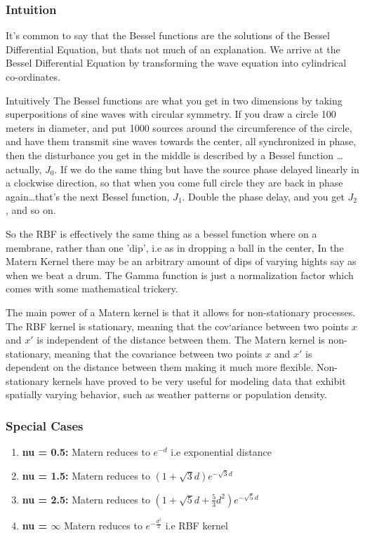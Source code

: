 \documentclass[hidelinks]{book}
\numberwithin{equation}{section}
\begin{document}
\subsubsection{Intuition}
It's common to say that the Bessel functions are the solutions of the Bessel
Differential Equation, but thats not much of an explanation. We arrive at
the Bessel Differential Equation by transforming the wave equation into
cylindrical co-ordinates.

Intuitively The Bessel functions are what you get in two dimensions by taking
superpositions of sine waves with circular symmetry. If you draw a circle 100
meters in diameter, and put 1000 sources around the circumference of the circle,
and have them transmit sine waves towards the center, all synchronized in phase,
then the disturbance you get in the middle is described by a Bessel function
… actually, $J_0$. If we do the same thing but have the source phase delayed
linearly in a clockwise direction, so that when you come full circle they are
back in phase again…that's the next Bessel function, $J_1$. Double the phase
delay, and you get $J_2$, and so on.

So the RBF is effectively the same thing as a bessel function where on a membrane,
rather than one 'dip', i.e as in dropping a ball in the center, In the Matern
Kernel there may be an arbitrary amount of dips of varying hights say as when
we beat a drum. The Gamma function is just a normalization factor which comes
with some mathematical trickery.

The main power of a Matern kernel is that it allows for non-stationary processes.
The RBF kernel is stationary, meaning that the cov`ariance between two points
$x$ and $x'$ is independent of the distance between them. The Matern kernel is
non-stationary, meaning that the covariance between two points $x$ and $x'$ is
dependent on the distance between them making it much more flexible. Non-stationary
kernels have proved to be very useful for modeling data that exhibit spatially
varying behavior, such as weather patterns or population density.

\subsubsection{Special Cases}
\begin{enumerate}
  \item \textbf{nu = 0.5:} Matern reduces to $e^{-d}$ i.e exponential distance
  \item \textbf{nu = 1.5:} Matern reduces to $(1+ \sqrt3 d) e^{-\sqrt3 d}$
  \item \textbf{nu = 2.5:} Matern reduces to $(1+ \sqrt5 d + \frac{5}{3} d^2) e^{-\sqrt5 d}$
  \item \textbf{nu = $\infty$} Matern reduces to $e^{-\frac{d^2}{2}}$ i.e RBF
    kernel
\end{enumerate}
\end{document}
